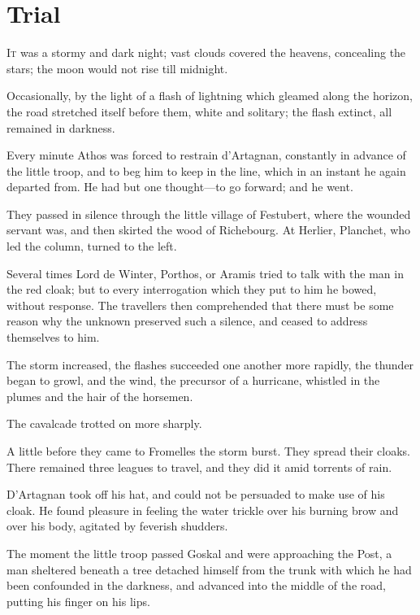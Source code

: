 
\chapter{Trial}

\lettrine[]{I}{t} was a stormy and dark night; vast clouds covered the heavens, concealing the stars; the moon would not rise till midnight. 

\zz
Occasionally, by the light of a flash of lightning which gleamed along the horizon, the road stretched itself before them, white and solitary; the flash extinct, all remained in darkness. 

Every minute Athos was forced to restrain d'Artagnan, constantly in advance of the little troop, and to beg him to keep in the line, which in an instant he again departed from. He had but one thought---to go forward; and he went. 

They passed in silence through the little village of Festubert, where the wounded servant was, and then skirted the wood of Richebourg. At Herlier, Planchet, who led the column, turned to the left. 

Several times Lord de Winter, Porthos, or Aramis tried to talk with the man in the red cloak; but to every interrogation which they put to him he bowed, without response. The travellers then comprehended that there must be some reason why the unknown preserved such a silence, and ceased to address themselves to him. 

The storm increased, the flashes succeeded one another more rapidly, the thunder began to growl, and the wind, the precursor of a hurricane, whistled in the plumes and the hair of the horsemen. 

The cavalcade trotted on more sharply. 

A little before they came to Fromelles the storm burst. They spread their cloaks. There remained three leagues to travel, and they did it amid torrents of rain. 

D'Artagnan took off his hat, and could not be persuaded to make use of his cloak. He found pleasure in feeling the water trickle over his burning brow and over his body, agitated by feverish shudders. 

The moment the little troop passed Goskal and were approaching the Post, a man sheltered beneath a tree detached himself from the trunk with which he had been confounded in the darkness, and advanced into the middle of the road, putting his finger on his lips. 

